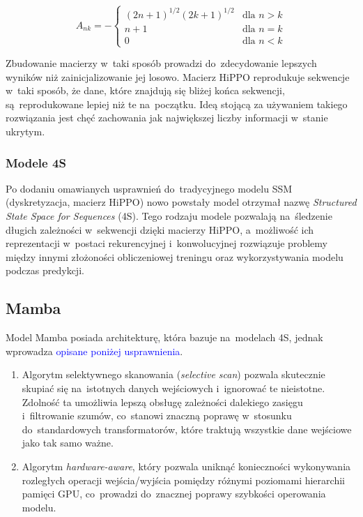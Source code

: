 \documentclass[data-science]{agh-wi} %
\begin{document}
\begin{equation}
    A_{nk} = -
    \begin{cases}
        (2n + 1)^{1/2} (2k + 1)^{1/2} & \text{dla } n > k \\
        n + 1                         & \text{dla } n = k \\
        0                             & \text{dla } n < k
    \end{cases}
    \label{equ:hippo_matrix}
\end{equation}

Zbudowanie macierzy w~taki sposób prowadzi do~zdecydowanie lepszych wyników niż zainicjalizowanie jej losowo. Macierz HiPPO reprodukuje sekwencje w~taki sposób, że dane, które znajdują się bliżej końca sekwencji, są~reprodukowane lepiej niż te na~początku. Ideą stojącą za używaniem takiego rozwiązania jest chęć zachowania jak największej liczby informacji w~stanie ukrytym.

\subsubsection*{Modele 4S}
Po dodaniu omawianych usprawnień do~tradycyjnego modelu SSM (dyskretyzacja, macierz HiPPO) nowo powstały model otrzymał nazwę \textit{Structured State Space for Sequences} (4S). Tego rodzaju modele pozwalają na~śledzenie długich zależności w~sekwencji dzięki macierzy HiPPO, a~możliwość ich reprezentacji w~postaci rekurencyjnej i~konwolucyjnej rozwiązuje problemy między innymi złożoności obliczeniowej treningu oraz wykorzystywania modelu podczas predykcji.

\subsection{Mamba}
Model Mamba posiada architekturę, która bazuje na~modelach 4S, jednak wprowadza \textcolor{blue}{opisane poniżej usprawnienia}.
\begin{enumerate}
    \item Algorytm selektywnego skanowania (\textit{selective scan}) pozwala skutecznie skupiać się na~istotnych danych wejściowych i~ignorować te nieistotne. Zdolność ta umożliwia lepszą obsługę zależności dalekiego zasięgu i~filtrowanie szumów, co~stanowi znaczną poprawę w~stosunku do~standardowych transformatorów, które traktują wszystkie dane wejściowe jako tak samo ważne.
    \item Algorytm \textit{hardware-aware}, który pozwala uniknąć konieczności wykonywania rozległych operacji wejścia/wyjścia pomiędzy różnymi poziomami hierarchii pamięci GPU, co~prowadzi do~znacznej poprawy szybkości operowania modelu.
\end{enumerate}
\end{document}
